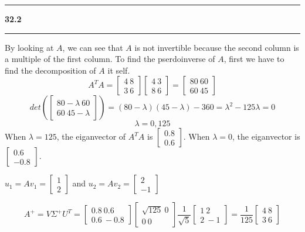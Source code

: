 \documentclass[11pt]{article}
\newcommand\question[2]{\vspace{.25in}\hrule\textbf{#1 #2}\vspace{.5em}\hrule\vspace{.10in}}
\begin{document}
\question{32.2}{}
By looking at \(A\), we can see that \(A\) is not invertible because the second column is a multiple of the first column. To find the pserdoinverse of \(A\), first we have to find the decomposition of \(A\) it self.
$$A^TA = \begin{bmatrix} 4 \ 8 \\ 3 \ 6 \end{bmatrix}\begin{bmatrix} 4 \ 3 \\ 8 \ 6 \end{bmatrix} = \begin{bmatrix} 80 \ 60 \\ 60 \ 45 \end{bmatrix}$$
$$det(\begin{bmatrix} 80-\lambda \ 60 \\ 60 \ 45-\lambda \end{bmatrix}) = (80-\lambda)(45-\lambda)-360 = \lambda^2 - 125\lambda = 0$$
$$\lambda = 0, 125$$
When \(\lambda = 125\), the eiganvector of \(A^TA\) is \(\begin{bmatrix} 0.8 \\ 0.6 \end{bmatrix}\). When \(\lambda = 0\), the eiganvector is \(\begin{bmatrix} 0.6 \\ -0.8 \end{bmatrix}\).

\(u_1 = Av_1 = \begin{bmatrix} 1 \\ 2 \end{bmatrix}\) and \(u_2 = Av_2 = \begin{bmatrix} 2 \\ -1 \end{bmatrix}\)

$$A^{+} = V\Sigma^{+}U^T = \begin{bmatrix} 0.8 \ 0.6 \\ 0.6 \ -0.8 \end{bmatrix}\begin{bmatrix} \sqrt{125} \ 0 \\ 0 \ 0 \end{bmatrix}\frac{1}{\sqrt{5}}\begin{bmatrix} 1 \ 2 \\ 2 \ -1 \end{bmatrix} = \frac{1}{125}\begin{bmatrix} 4 \ 8 \\ 3 \ 6 \end{bmatrix}$$
\end{document}
